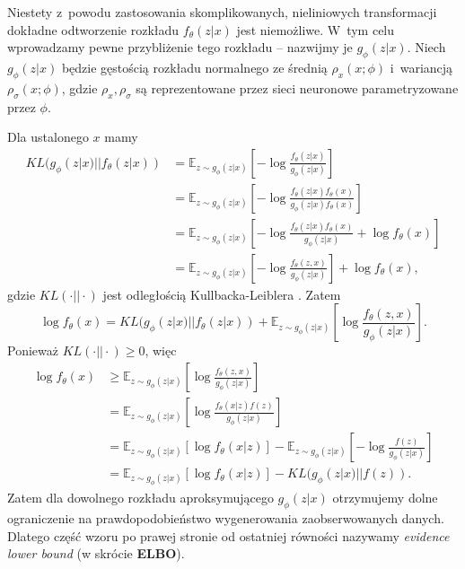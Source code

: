 \documentclass{iithesis}
\begin{document}
Niestety z~powodu zastosowania skomplikowanych, nieliniowych
transformacji dokładne odtworzenie rozkładu $f_\theta(z|x)$ jest niemożliwe.
W~tym celu wprowadzamy pewne przybliżenie tego rozkładu -- nazwijmy je
$g_\phi(z|x)$. Niech $g_\phi(z|x)$ będzie gęstością
rozkładu normalnego ze średnią $\rho_x(x;\phi)$ i~wariancją $\rho_\sigma(x;\phi)$,
gdzie $\rho_x,\rho_\sigma$ są reprezentowane przez sieci neuronowe parametryzowane przez $\phi$.


Dla ustalonego $x$ mamy
\begin{equation*}
\begin{split}
KL(g_\phi(z|x) || f_\theta(z|x)) &= \mathbb{E}_{z \sim g_\phi(z|x)}\left[
-\log\frac{f_\theta(z|x)}{g_\phi(z|x)}\right] \\
&=\mathbb{E}_{z\sim g_\phi(z|x)}\left[-\log\frac{f_\theta(z|x)f_\theta(x)}{g_\phi(z|x)f_\theta(x)}\right] \\
&=\mathbb{E}_{z\sim g_\phi(z|x)}\left[-\log\frac{f_\theta(z|x)f_\theta(x)}{g_\phi(z|x)}+\log f_\theta(x)\right] \\
&=\mathbb{E}_{z\sim g_\phi(z|x)}\left[-\log\frac{f_\theta(z,x)}{g_\phi(z|x)}\right] +\log f_\theta(x),
\end{split}
\end{equation*}
gdzie $KL(\cdotp || \cdotp)$ jest odległością Kullbacka-Leiblera \cite{kl-cost}.
Zatem
\begin{equation*}
\log f_\theta(x) = KL(g_\phi(z|x) || f_\theta(z|x)) +
\mathbb{E}_{z \sim g_\phi(z|x)}\left[\log\frac{f_\theta(z,x)}{g_\phi(z|x)}\right].
\end{equation*}
Ponieważ $KL(\cdotp || \cdotp) \geq 0$, więc
\begin{equation} \label{eq:elbo}
\begin{split}
\log f_\theta(x)  &\geq \mathbb{E}_{z \sim g_\phi(z|x)}\left[\log\frac{f_\theta(z,x)}{g_\phi(z|x)}\right] \\
&= \mathbb{E}_{z \sim g_\phi(z|x)}\left[\log\frac{f_\theta(x|z)f(z)}{g_\phi(z|x)}\right] \\
&=\mathbb{E}_{z \sim g_\phi(z|x)}\left[\log f_\theta(x|z)\right] -
\mathbb{E}_{z \sim g_\phi(z|x)}\left[-\log\frac{f(z)}{g_\phi(z|x)}\right] \\
&=\mathbb{E}_{z\sim g_\phi(z|x)}\left[\log f_\theta(x|z)\right] - KL(g_\phi(z|x) || f(z)).
\end{split}
\end{equation}
Zatem dla dowolnego rozkładu aproksymującego $g_\phi(z|x)$ otrzymujemy dolne
ograniczenie na prawdopodobieństwo wygenerowania zaobserwowanych danych.
Dlatego część wzoru po prawej stronie od ostatniej równości
nazywamy \textit{evidence lower bound} (w skrócie \textbf{ELBO}).
\end{document}
